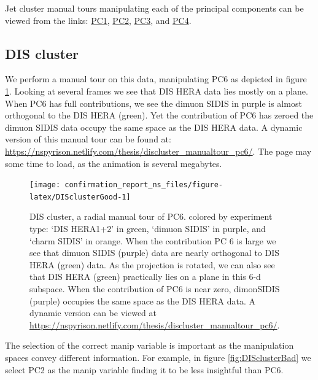 \documentclass{monashthesis}
\begin{document}
Jet cluster manual tours manipulating each of the principal components
can be viewed from the links:
\href{https://nspyrison.netlify.com/thesis/jetcluster_manualtour_pc1/}{PC1},
\href{https://nspyrison.netlify.com/thesis/jetcluster_manualtour_pc2/}{PC2},
\href{https://nspyrison.netlify.com/thesis/jetcluster_manualtour_pc3/}{PC3},
and
\href{https://nspyrison.netlify.com/thesis/jetcluster_manualtour_pc4/}{PC4}.

\subsection{DIS cluster}\label{dis-cluster}

We perform a manual tour on this data, manipulating PC6 as depicted in
figure \ref{fig:DISclusterGood}. Looking at several frames we see that
DIS HERA data lies mostly on a plane. When PC6 has full contributions,
we see the dimuon SIDIS in purple is almost orthogonal to the DIS HERA
(green). Yet the contribution of PC6 has zeroed the dimuon SIDIS data
occupy the same space as the DIS HERA data. A dynamic version of this
manual tour can be found at:
\url{https://nspyrison.netlify.com/thesis/discluster_manualtour_pc6/}.
The page may some time to load, as the animation is several megabytes.











\begin{figure}

{\centering \texttt{[image: confirmation\_report\_ns\_files/figure-latex/DISclusterGood-1]} 

}

\caption{DIS cluster, a radial manual tour of PC6.
colored by experiment type: `DIS HERA1+2' in green, `dimuon SIDIS' in
purple, and `charm SIDIS' in orange. When the contribution PC 6 is large
we see that dimuon SIDIS (purple) data are nearly orthogonal to DIS HERA
(green) data. As the projection is rotated, we can also see that DIS
HERA (green) practically lies on a plane in this 6-d subspace. When the
contribution of PC6 is near zero, dimonSIDIS (purple) occupies the same
space as the DIS HERA data. A dynamic version can be viewed at
\url{https://nspyrison.netlify.com/thesis/discluster_manualtour_pc6/}.}\label{fig:DISclusterGood}
\end{figure}

The selection of the correct manip variable is important as the
manipulation spaces convey different information. For example, in figure
\ref{fig:DISclusterBad} we select PC2 as the manip variable finding it
to be less insightful than PC6.
\end{document}
